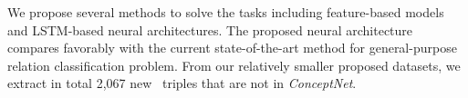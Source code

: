 %
%
%


We propose several methods to solve the tasks including feature-based models and LSTM-based neural architectures. 
The proposed neural architecture compares favorably with the current state-of-the-art method for general-purpose relation classification problem.
From our relatively smaller proposed datasets, we extract in total 2,067 new \lnear~triples that are not in \textit{ConceptNet}.


